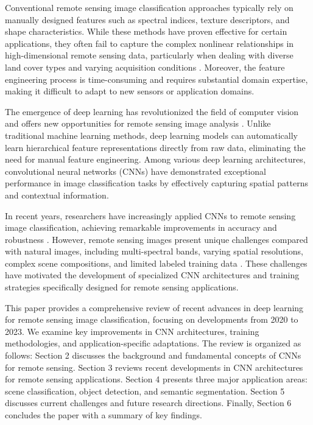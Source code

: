 \documentclass[12pt,a4paper]{article}
\begin{document}
Conventional remote sensing image classification approaches typically rely on manually designed features such as spectral indices, texture descriptors, and shape characteristics. While these methods have proven effective for certain applications, they often fail to capture the complex nonlinear relationships in high-dimensional remote sensing data, particularly when dealing with diverse land cover types and varying acquisition conditions \cite{cheng2016survey}. Moreover, the feature engineering process is time-consuming and requires substantial domain expertise, making it difficult to adapt to new sensors or application domains.

The emergence of deep learning has revolutionized the field of computer vision and offers new opportunities for remote sensing image analysis \cite{zhu2017deep}. Unlike traditional machine learning methods, deep learning models can automatically learn hierarchical feature representations directly from raw data, eliminating the need for manual feature engineering. Among various deep learning architectures, convolutional neural networks (CNNs) have demonstrated exceptional performance in image classification tasks by effectively capturing spatial patterns and contextual information.

In recent years, researchers have increasingly applied CNNs to remote sensing image classification, achieving remarkable improvements in accuracy and robustness \cite{liu2019learning}. However, remote sensing images present unique challenges compared with natural images, including multi-spectral bands, varying spatial resolutions, complex scene compositions, and limited labeled training data \cite{cheng2016survey}. These challenges have motivated the development of specialized CNN architectures and training strategies specifically designed for remote sensing applications.

This paper provides a comprehensive review of recent advances in deep learning for remote sensing image classification, focusing on developments from 2020 to 2023. We examine key improvements in CNN architectures, training methodologies, and application-specific adaptations. The review is organized as follows: Section 2 discusses the background and fundamental concepts of CNNs for remote sensing. Section 3 reviews recent developments in CNN architectures for remote sensing applications. Section 4 presents three major application areas: scene classification, object detection, and semantic segmentation. Section 5 discusses current challenges and future research directions. Finally, Section 6 concludes the paper with a summary of key findings.
\end{document}
